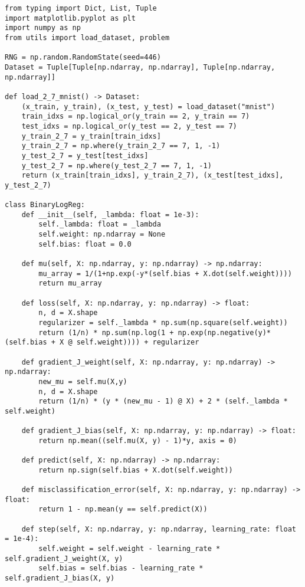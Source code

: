 \documentclass{article}
\begin{document}
\begin{lstlisting}
from typing import Dict, List, Tuple
import matplotlib.pyplot as plt
import numpy as np
from utils import load_dataset, problem

RNG = np.random.RandomState(seed=446)
Dataset = Tuple[Tuple[np.ndarray, np.ndarray], Tuple[np.ndarray, np.ndarray]]

def load_2_7_mnist() -> Dataset:
    (x_train, y_train), (x_test, y_test) = load_dataset("mnist")
    train_idxs = np.logical_or(y_train == 2, y_train == 7)
    test_idxs = np.logical_or(y_test == 2, y_test == 7)
    y_train_2_7 = y_train[train_idxs]
    y_train_2_7 = np.where(y_train_2_7 == 7, 1, -1)
    y_test_2_7 = y_test[test_idxs]
    y_test_2_7 = np.where(y_test_2_7 == 7, 1, -1)
    return (x_train[train_idxs], y_train_2_7), (x_test[test_idxs], y_test_2_7)

class BinaryLogReg:
    def __init__(self, _lambda: float = 1e-3):
        self._lambda: float = _lambda
        self.weight: np.ndarray = None
        self.bias: float = 0.0

    def mu(self, X: np.ndarray, y: np.ndarray) -> np.ndarray:
        mu_array = 1/(1+np.exp(-y*(self.bias + X.dot(self.weight))))
        return mu_array

    def loss(self, X: np.ndarray, y: np.ndarray) -> float:
        n, d = X.shape
        regularizer = self._lambda * np.sum(np.square(self.weight))
        return (1/n) * np.sum(np.log(1 + np.exp(np.negative(y)*(self.bias + X @ self.weight)))) + regularizer

    def gradient_J_weight(self, X: np.ndarray, y: np.ndarray) -> np.ndarray:
        new_mu = self.mu(X,y)
        n, d = X.shape
        return (1/n) * (y * (new_mu - 1) @ X) + 2 * (self._lambda * self.weight)

    def gradient_J_bias(self, X: np.ndarray, y: np.ndarray) -> float:
        return np.mean((self.mu(X, y) - 1)*y, axis = 0)

    def predict(self, X: np.ndarray) -> np.ndarray:
        return np.sign(self.bias + X.dot(self.weight))

    def misclassification_error(self, X: np.ndarray, y: np.ndarray) -> float:
        return 1 - np.mean(y == self.predict(X))

    def step(self, X: np.ndarray, y: np.ndarray, learning_rate: float = 1e-4):
        self.weight = self.weight - learning_rate * self.gradient_J_weight(X, y)
        self.bias = self.bias - learning_rate * self.gradient_J_bias(X, y)


\end{lstlisting}
\end{document}
